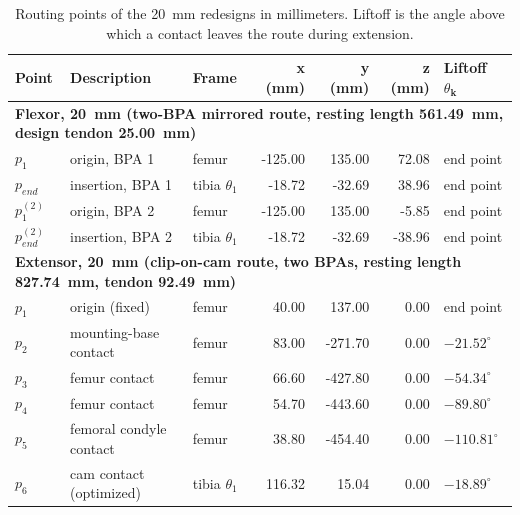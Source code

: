 \documentclass[utf8]{frontiers_suppmat} %
\begin{document}
\begin{table}[htbp]
\caption{Routing points of the \qty{20}{\mm} redesigns in millimeters. Liftoff is the angle above which a contact leaves the route during extension.}
\label{tab:RouteRedesign20}
\centering
\small
\begin{tabular}{lllrrrl}
\toprule
\textbf{Point} & \textbf{Description} & \textbf{Frame} & \textbf{x (mm)} & \textbf{y (mm)} & \textbf{z (mm)} & \textbf{Liftoff $\theta_{\mathbf{k}}$} \\
\midrule
\multicolumn{7}{l}{\textbf{Flexor, \qty{20}{\milli\metre} (two-BPA mirrored route, resting length \qty{561.49}{\milli\metre}, design tendon \qty{25.00}{\milli\metre})}} \\
\hspace{3mm} $p_{1}$ & origin, BPA 1 & femur & -125.00 & 135.00 & 72.08 & end point \\
\hspace{3mm} $p_{end}$ & insertion, BPA 1 & tibia $\theta_{1}$ & -18.72 & -32.69 & 38.96 & end point \\
\hspace{3mm} $p_{1}^{(2)}$ & origin, BPA 2 & femur & -125.00 & 135.00 & -5.85 & end point \\
\hspace{3mm} $p_{end}^{(2)}$ & insertion, BPA 2 & tibia $\theta_{1}$ & -18.72 & -32.69 & -38.96 & end point \\
\multicolumn{7}{l}{\textbf{Extensor, \qty{20}{\milli\metre} (clip-on-cam route, two BPAs, resting length \qty{827.74}{\milli\metre}, tendon \qty{92.49}{\milli\metre})}} \\
\hspace{3mm} $p_{1}$ & origin (fixed) & femur & 40.00 & 137.00 & 0.00 & end point \\
\hspace{3mm} $p_{2}$ & mounting-base contact & femur & 83.00 & -271.70 & 0.00 & $-21.52^{\circ}$ \\
\hspace{3mm} $p_{3}$ & femur contact & femur & 66.60 & -427.80 & 0.00 & $-54.34^{\circ}$ \\
\hspace{3mm} $p_{4}$ & femur contact & femur & 54.70 & -443.60 & 0.00 & $-89.80^{\circ}$ \\
\hspace{3mm} $p_{5}$ & femoral condyle contact & femur & 38.80 & -454.40 & 0.00 & $-110.81^{\circ}$ \\
\hspace{3mm} $p_{6}$ & cam contact (optimized) & tibia $\theta_{1}$ & 116.32 & 15.04 & 0.00 & $-18.89^{\circ}$ \\

\end{tabular}
\end{table}
\end{document}
